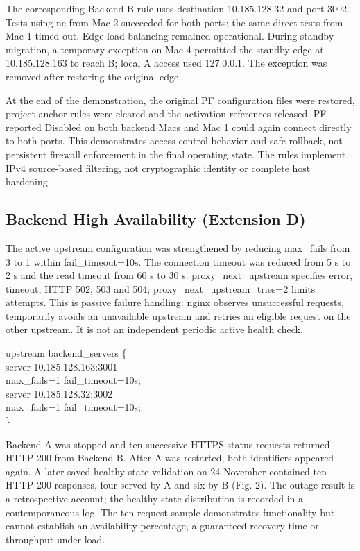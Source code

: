 \documentclass[conference]{IEEEtran}
\begin{document}
The corresponding Backend B rule uses destination 10.185.128.32 and port
3002. Tests using nc from Mac 2 succeeded for both ports; the same
direct tests from Mac 1 timed out. Edge load balancing remained
operational. During standby migration, a temporary exception on Mac 4
permitted the standby edge at 10.185.128.163 to reach B; local A access
used 127.0.0.1. The exception was removed after restoring the original
edge.

At the end of the demonstration, the original PF configuration files
were restored, project anchor rules were cleared and the activation
references released. PF reported Disabled on both backend Macs and Mac 1
could again connect directly to both ports. This demonstrates
access-control behavior and safe rollback, not persistent firewall
enforcement in the final operating state. The rules implement IPv4
source-based filtering, not cryptographic identity or complete host
hardening.

\subsection{Backend High Availability (Extension
D)}\label{d.-backend-high-availability-extension-d}

The active upstream configuration was strengthened by reducing
max\_fails from 3 to 1 within fail\_timeout=10s. The connection timeout
was reduced from 5 s to 2 s and the read timeout from 60 s to 30 s.
proxy\_next\_upstream specifies error, timeout, HTTP 502, 503 and 504;
proxy\_next\_upstream\_tries=2 limits attempts. This is passive failure
handling: nginx observes unsuccessful requests, temporarily avoids an
unavailable upstream and retries an eligible request on the other
upstream. It is not an independent periodic active health check.

upstream backend\_servers \{\\
server 10.185.128.163:3001\\
max\_fails=1 fail\_timeout=10s;\\
server 10.185.128.32:3002\\
max\_fails=1 fail\_timeout=10s;\\
\}

Backend A was stopped and ten successive HTTPS status requests returned
HTTP 200 from Backend B. After A was restarted, both identifiers
appeared again. A later saved healthy-state validation on 24 November
contained ten HTTP 200 responses, four served by A and six by B (Fig.
2). The outage result is a retrospective account; the healthy-state
distribution is recorded in a contemporaneous log. The ten-request
sample demonstrates functionality but cannot establish an availability
percentage, a guaranteed recovery time or throughput under load.
\end{document}
